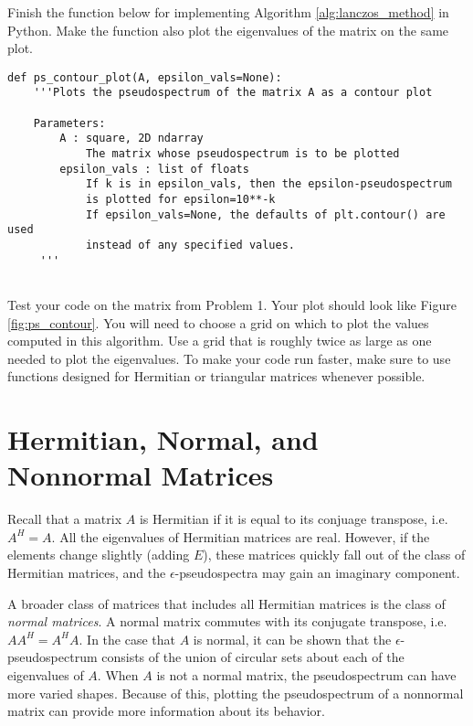 \begin{problem}
Finish the function below for implementing Algorithm \ref{alg:lanczos_method} in Python. Make the function also plot the eigenvalues of the matrix on the same plot.

\begin{lstlisting}
def ps_contour_plot(A, epsilon_vals=None):
    '''Plots the pseudospectrum of the matrix A as a contour plot
    
    Parameters:
        A : square, 2D ndarray
            The matrix whose pseudospectrum is to be plotted
        epsilon_vals : list of floats
            If k is in epsilon_vals, then the epsilon-pseudospectrum
            is plotted for epsilon=10**-k
            If epsilon_vals=None, the defaults of plt.contour() are used
            instead of any specified values.
     '''
    
\end{lstlisting}

Test your code on the matrix from Problem 1. Your plot should look like Figure \ref{fig:ps_contour}. You will need to choose a grid on which to plot the values computed in this algorithm. Use a grid that is roughly twice as large as one needed to plot the eigenvalues. To make your code run faster, make sure to use functions designed for Hermitian or triangular matrices whenever possible.

\end{problem}

\section*{Hermitian, Normal, and Nonnormal Matrices}
Recall that a matrix $A$ is Hermitian if it is equal to its conjuage transpose, i.e. $A^{H} = A$.  All the eigenvalues of Hermitian matrices are real.  However, if the elements change slightly (adding $E$), these matrices quickly fall out of the class of Hermitian matrices, and the $\epsilon$-pseudospectra may gain an imaginary component.

A broader class of matrices that includes all Hermitian matrices is the class of \emph{normal matrices}.  A normal matrix commutes with its conjugate transpose, i.e. $A A^{H} = A^{H} A$. In the case that $A$ is normal, it can be shown that the $\epsilon$-pseudospectrum consists of the union of circular sets about each of the eigenvalues of $A$. When $A$ is not a normal matrix, the pseudospectrum can have more varied shapes. Because of this, plotting the pseudospectrum of a nonnormal matrix can provide more information about its behavior.

